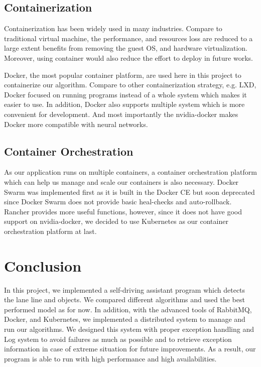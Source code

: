 \documentclass[runningheads]{llncs}
\begin{document}
\subsection{Containerization}
Containerization has been widely used in many industries. 
Compare to traditional virtual machine, the performance, 
and resources loss are reduced to a large extent benefits 
from removing the guest OS, and hardware virtualization. 
Moreover, using container would also reduce the effort to 
deploy in future works. 

Docker, the most popular container platform, are used here 
in this project to containerize our algorithm. Compare to 
other containerization strategy, e.g. LXD, Docker focused 
on running programs instead of a whole system which makes 
it easier to use. In addition, Docker also supports multiple 
system which is more convenient for development. And most 
importantly the nvidia-docker makes Docker more compatible 
with neural networks.

\subsection{Container Orchestration}
As our application runs on multiple containers, a container 
orchestration platform which can help us manage and scale 
our containers is also necessary. Docker Swarm was implemented 
first as it is built in the Docker CE but soon deprecated 
since Docker Swarm does not provide basic heal-checks 
and auto-rollback. Rancher provides more useful functions, 
however, since it does not have good support on 
nvidia-docker, we decided to use Kubernetes as our 
container orchestration platform at last.


\section{Conclusion}
In this project, we implemented a self-driving assistant 
program which detects the lane line and objects. We 
compared different algorithms and used the best performed 
model as for now. In addition, with the advanced tools of 
RabbitMQ, Docker, and Kubernetes, we implemented a 
distributed system to manage and run our algorithms. We 
designed this system with proper exception handling and Log 
system to avoid failures as much as possible and to 
retrieve exception information in case of extreme situation 
for future improvements. As a result, our program is able 
to run with high performance and high availabilities. 
\end{document}
